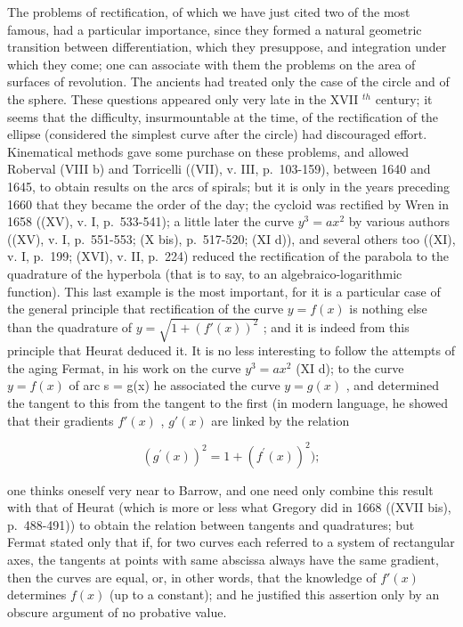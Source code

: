 The problems of rectification, of which we have just cited two of the most famous, had a particular importance, since they formed a natural geometric transition between differentiation, which they presuppose, and integration under which they come; one can associate with them the problems on the area of surfaces of revolution. The ancients had treated only the case of the circle and of the sphere. These questions appeared only very late in the XVII \(^{th}\) century; it seems that the difficulty, insurmountable at the time, of the rectification of the ellipse (considered the simplest curve after the circle) had discouraged effort. Kinematical methods gave some purchase on these problems, and allowed Roberval (VIII b) and Torricelli ((VII), v. III, p.~103-159), between 1640 and 1645, to obtain results on the arcs of spirals; but it is only in the years preceding 1660 that they became the order of the day; the cycloid was rectified by Wren in 1658 ((XV), v. I, p.~533-541); a little later the curve \(y^{3} = ax^{2}\) by various authors ((XV), v. I, p.~551-553; (X bis), p.~517-520; (XI d)), and several others too ((XI), v. I, p.~199; (XVI), v. II, p.~224) reduced the rectification of the parabola to the quadrature of the hyperbola (that is to say, to an algebraico-logarithmic function). This last example is the most important, for it is a particular case of the general principle that rectification of the curve \(y = f(x)\) is nothing else than the quadrature of \(y = \sqrt{1 + (f'(x))^2}\) ; and it is indeed from this principle that Heurat deduced it. It is no less interesting to follow the attempts of the aging Fermat, in his work on the curve \(y^3 = ax^2\) (XI d); to the curve \(y = f(x)\) of arc s = g(x) he associated the curve \(y = g(x)\) , and determined the tangent to this from the tangent to the first (in modern language, he showed that their gradients \(f'(x)\) , \(g'(x)\) are linked by the relation

\[
\left(g ^ {\prime} (x)\right) ^ {2} = 1 + \left(f ^ {\prime} (x)\right) ^ {2});
\]

one thinks oneself very near to Barrow, and one need only combine this result with that of Heurat (which is more or less what Gregory did in 1668 ((XVII bis), p.~488-491)) to obtain the relation between tangents and quadratures; but Fermat stated only that if, for two curves each referred to a system of rectangular axes, the tangents at points with same abscissa always have the same gradient, then the curves are equal, or, in other words, that the knowledge of \(f'(x)\) determines \(f(x)\) (up to a constant); and he justified this assertion only by an obscure argument of no probative value.

